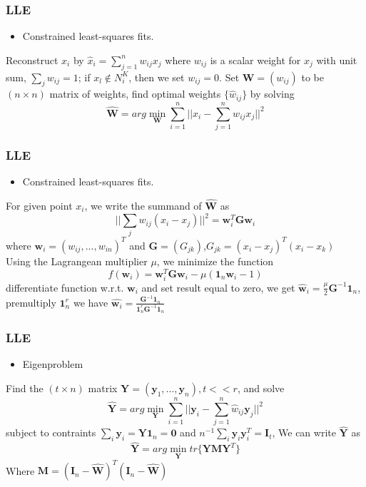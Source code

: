 \documentclass{beamer}
\begin{document}
\begin{frame}
\frametitle{LLE}
\begin{itemize}
  \item Constrained least-squares fits.
\end{itemize}
Reconstruct $x_i$ by $\hat{x}_i=\sum_{j=1}^n w_{ij}x_j$ where $w_{ij}$ is a scalar weight for $x_j$ with unit sum, $\sum_j w_{ij}=1$; if $x_l \not\in N_i^K$, then we set $w_{ij}=0$. Set $\textbf{W}=(w_{ij})$ to be $(n \times n)$ matrix of weights, find optimal weights $\{\hat{w}_{ij}\}$ by solving
\[\hat{\textbf{W}}=arg\min_{\textbf{W}}\sum_{i=1}^n||x_i-\sum_{j=1}^n w_{ij}x_j||^2 \]
\end{frame}

\begin{frame}
\frametitle{LLE}
\begin{itemize}
  \item Constrained least-squares fits.
\end{itemize}
For given point $x_i$, we write the summand of $\hat{\textbf{W}}$ as 
\[||\sum_j w_{ij}(x_i-x_j)||^2=\textbf{w}_i^T\textbf{G}\textbf{w}_i\]
where $\textbf{w}_i=(w_{ij},...,w_{in})^T$ and $\textbf{G}=(G_{jk})$,$G_{jk}=(x_i-x_j)^T(x_i-x_k)$\\
Using the Lagrangean multiplier $\mu$, we minimize the function
\[f(\textbf{w}_i)=\textbf{w}_i^T\textbf{G}\textbf{w}_i-\mu(\textbf{1}_n\textbf{w}_i-1)\]
differentiate function w.r.t. $\textbf{w}_i$ and set result equal to zero, we get $\hat{\textbf{w}}_i = \frac{\mu}{2}\textbf{G}^{-1}\textbf{1}_n$, premultiply $\textbf{1}_n^r$ we have $\hat{\textbf{w}_i}=\frac{\textbf{G}^{-1}\textbf{1}_n}{\textbf{1}_n^r\textbf{G}^{-1}\textbf{1}_n}$
\end{frame}

\begin{frame}
\frametitle{LLE}
\begin{itemize}
  \item Eigenproblem
\end{itemize}
Find the $(t \times n)$ matrix $\textbf{Y}=(\textbf{y}_1,...,\textbf{y}_n),t<<r$, and solve
\[\hat{\textbf{Y}}=arg\min_{\textbf{Y}}\sum_{i=1}^n||\textbf{y}_i-\sum_{j=1}^n\hat{w}_{ij}\textbf{y}_j||^2\]
subject to contraints $\sum_i \textbf{y}_i=\textbf{Y}\textbf{1}_n=\textbf{0}$ and $n^{-1}\sum_i\textbf{y}_i\textbf{y}_i^T=\textbf{I}_t$,
We can write $\hat{\textbf{Y}}$ as 
\[\hat{\textbf{Y}}=arg \min_{\textbf{Y}}tr\{\textbf{Y}\textbf{M}\textbf{Y}^T\}\]
Where $\textbf{M}=(\textbf{I}_n-\hat{\textbf{W}})^T(\textbf{I}_n-\hat{\textbf{W}})$
\end{frame}
\end{document}
